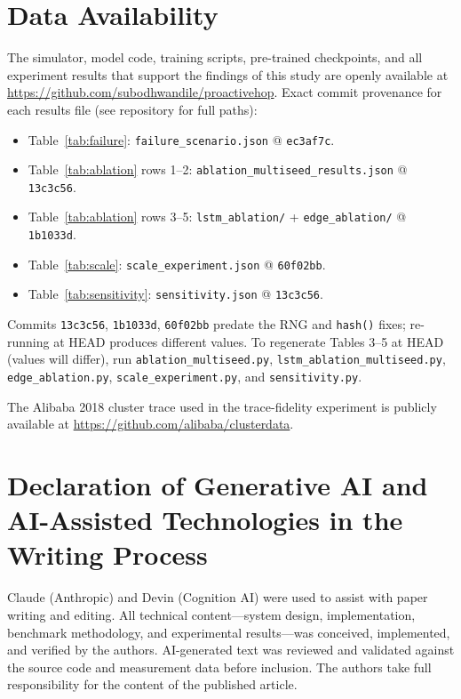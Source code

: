 \documentclass[review,1p]{elsarticle}
\theoremstyle{definition}
\begin{document}
\section*{Data Availability}
The simulator, model code, training scripts, pre-trained checkpoints, and all
experiment results that support the findings of this study are openly available at
\url{https://github.com/subodhwandile/proactivehop}.
Exact commit provenance for each results file (see repository for full paths):
\begin{itemize}
  \item Table~\ref{tab:failure}: \texttt{failure\_scenario.json} @ \texttt{ec3af7c}.
  \item Table~\ref{tab:ablation} rows 1--2: \texttt{ablation\_multiseed\_results.json} @ \texttt{13c3c56}.
  \item Table~\ref{tab:ablation} rows 3--5: \texttt{lstm\_ablation/} + \texttt{edge\_ablation/} @ \texttt{1b1033d}.
  \item Table~\ref{tab:scale}: \texttt{scale\_experiment.json} @ \texttt{60f02bb}.
  \item Table~\ref{tab:sensitivity}: \texttt{sensitivity.json} @ \texttt{13c3c56}.
\end{itemize}
\begin{sloppypar}
Commits \texttt{13c3c56}, \texttt{1b1033d}, \texttt{60f02bb} predate the RNG and
\texttt{hash()} fixes; re-running at HEAD produces different values.
To regenerate Tables 3--5 at HEAD (values will differ), run \texttt{ablation\_multiseed.py},
\texttt{lstm\_ablation\_multiseed.py}, \texttt{edge\_ablation.py},
\texttt{scale\_experiment.py}, and \texttt{sensitivity.py}.
\end{sloppypar}
The Alibaba 2018 cluster trace used in the trace-fidelity experiment is publicly
available at \url{https://github.com/alibaba/clusterdata}.

\section*{Declaration of Generative AI and AI-Assisted Technologies in the Writing Process}
Claude (Anthropic) and Devin (Cognition AI) were used to assist with
paper writing and editing.  All technical content---system design,
implementation, benchmark methodology, and experimental results---was
conceived, implemented, and verified by the authors.  AI-generated text
was reviewed and validated against the source code and measurement data
before inclusion.  The authors take full responsibility for the content
of the published article.
\end{document}
